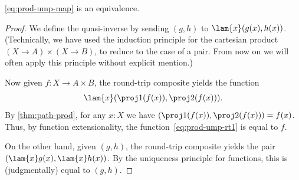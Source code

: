%
\begin{thm}\label{thm:prod-ump}
  \eqref{eq:prod-ump-map} is an equivalence.
\end{thm}

\begin{proof}
  We define the quasi-inverse by sending $(g,h)$ to $\lam{x}(g(x),h(x))$.
  (Technically, we have used the induction principle for the cartesian product $(X\to A)\times (X\to B)$, to reduce to the case of a pair.
  From now on we will often apply this principle without explicit mention.)

  Now given $f:X\to A\times B$, the round-trip composite yields the function
  \begin{equation}
    \lam{x} (\proj1(f(x)),\proj2(f(x))).\label{eq:prod-ump-rt1}
  \end{equation}
  By \cref{thm:path-prod}, for any $x:X$ we have $(\proj1(f(x)),\proj2(f(x))) = f(x)$.
  Thus, by function extensionality, the function~\eqref{eq:prod-ump-rt1} is equal to $f$.

  On the other hand, given $(g,h)$, the round-trip composite yields the pair $(\lam{x} g(x),\lam{x} h(x))$.
  By the uniqueness principle for functions, this is (judgmentally) equal to $(g,h)$.
\end{proof}
